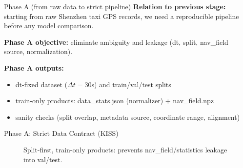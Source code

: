 \documentclass[aspectratio=169]{beamer}
\begin{document}
\begin{frame}{Phase A (from raw data to strict pipeline)}
\textbf{Relation to previous stage:} starting from raw Shenzhen taxi GPS records, we need a reproducible pipeline before any model comparison.

\vspace{0.6em}
\textbf{Phase A objective:} eliminate ambiguity and leakage (dt, split, nav\_field source, normalization).

\vspace{0.6em}
\textbf{Phase A outputs:}
\begin{itemize}
  \item dt-fixed dataset ($\Delta t=30$s) and train/val/test splits
  \item train-only products: data\_stats.json (normalizer) + nav\_field.npz
  \item sanity checks (split overlap, metadata source, coordinate range, alignment)
\end{itemize}
\end{frame}

\begin{frame}{Phase A: Strict Data Contract (KISS)}
\begin{figure}
\centering
{}
\caption*{\small Split-first, train-only products: prevents nav\_field/statistics leakage into val/test.}
\end{figure}
\end{frame}
\end{document}
